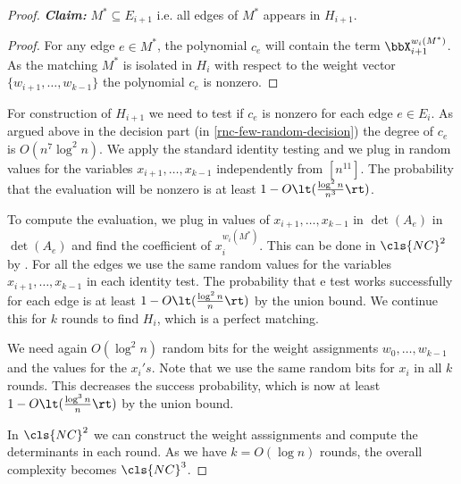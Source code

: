 \begin{proof}
	\textbf{\textit{Claim:} }$M^*\subseteq E_{i+1}$ i.e. all edges of $M^*$ appears in $H_{i+1}$.

	\begin{proof}
		For any edge $e\in M^*$, the polynomial $c_e$ will contain the term $\bbX_{i+1}^{w_i(M^*)}$. As the matching $M^*$ is isolated in $H_i$ with respect to the weight vector $\{w_{i+1},\dots, w_{k-1}\}$ the polynomial $c_e$ is nonzero.
	\end{proof}\parinn

	For construction of $H_{i+1}$ we need to test if $c_e$ is nonzero for each edge $e\in E_i$. As argued above in the decision part (in \autoref{rnc-few-random-decision}) the degree of $c_e$ is $O(n^7\log^2n)$. We apply the standard identity testing  and we plug in random values for the variables $x_{i+1},\dots, x_{k-1}$ independently from $[n^{11}]$. The probability that the evaluation will be nonzero is at least $1-O\lt( \frac{\log^2n }{n^3} \rt)$.

	To compute the evaluation, we plug in values of $x_{i+1},\dots, x_{k-1}$ in $\det(A_e)$ in $\det(A_e)$ and find the coefficient of $x_i^{w_i(M^*)}$. This can be done in $\cls{NC}^2$ by \cite[Corollary 4.4]{BorodinCookPippenger_1983_Pcf}. For all the edges we use the same random values for the variables $x_{i+1},\dots, x_{k-1}$ in each identity test. The probability that e test works successfully for each edge is at least $1-O\lt( \frac{\log^2n}{n}\rt)$ by the union bound. We continue this for $k$ rounds to find $H_i$, which is a perfect matching.


	We need again $O(\log^2 n)$ random bits for the weight assignments $w_0,\dots, w_{k-1}$ and the values for the $x_i's$. Note that we use the same random bits for $x_i$ in all $k$ rounds. This decreases the success probability, which is now at least $1-O\lt( \frac{\log^3n}{n} \rt)$ by the union bound.

	In $\cls{NC}^2$ we can construct the weight asssignments and compute the determinants in each round. As we have $k=O(\log n)$ rounds, the overall complexity becomes $\cls{NC}^3$.

\end{proof}